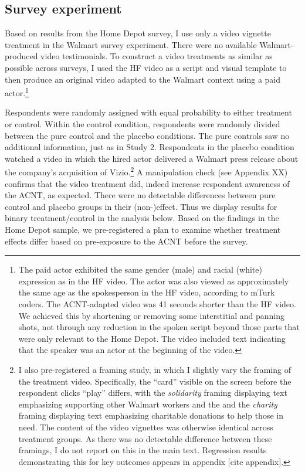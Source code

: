 \documentclass[
  11pt,
  oneside]{article}
\begin{document}
\subsection{Survey experiment}\label{survey-experiment}

Based on results from the Home Depot survey, I use only a video vignette treatment in the Walmart survey experiment. There were no available Walmart-produced video testimonials. To construct a video treatments as similar as possible across surveys, I used the HF video as a script and visual template to then produce an original video adapted to the Walmart context using a paid actor.\footnote{The paid actor exhibited the same gender (male) and racial (white) expression as in the HF video. The actor was also viewed as approximately the same age as the spokesperson in the HF video, according to mTurk coders. The ACNT-adapted video was 41 seconds shorter than the HF video. We achieved this by shortening or removing some interstitial and panning shots, not through any reduction in the spoken script beyond those parts that were only relevant to the Home Depot. The video included text indicating that the speaker was an actor at the beginning of the video.}

Respondents were randomly assigned with equal probability to either treatment or control. Within the control condition, respondents were randomly divided between the pure control and the placebo conditions. The pure controls saw no additional information, just as in Study 2. Respondents in the placebo condition watched a video in which the hired actor delivered a Walmart press release about the company's acquisition of Vizio.\footnote{I also pre-registered a framing study, in which I slightly vary the framing of the treatment video. Specifically, the ``card'' visible on the screen before the respondent clicks ``play'' differs, with the \emph{solidarity} framing displaying text emphasizing supporting other Walmart workers and the and the \emph{charity} framing displaying text emphasizing charitable donations to help those in need. The content of the video vignettes was otherwise identical across treatment groups. As there was no detectable difference between these framings, I do not report on this in the main text. Regression results demonstrating this for key outcomes appears in appendix {[}cite appendix{]}.} A manipulation check (see Appendix XX) confirms that the video treatment did, indeed increase respondent awareness of the ACNT, as expected. There were no detectable differences between pure control and placebo groups in their (non-)effect. Thus we display results for binary treatment/control in the analysis below. Based on the findings in the Home Depot sample, we pre-registered a plan to examine whether treatment effects differ based on pre-exposure to the ACNT before the survey.
\end{document}
